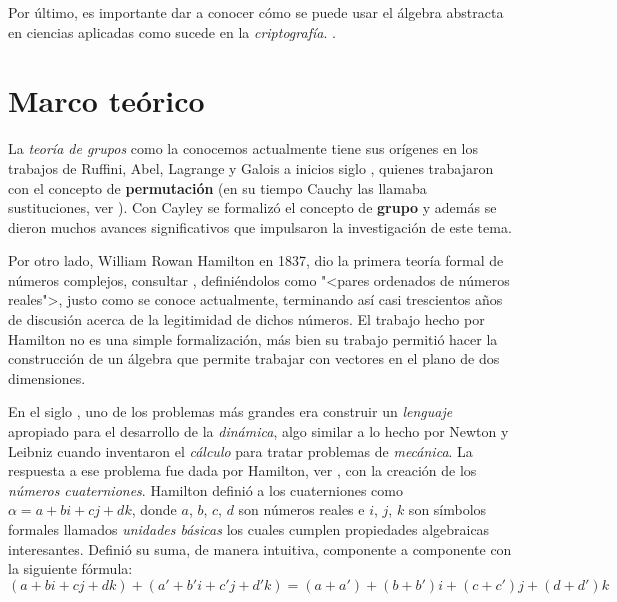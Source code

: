 \documentclass[12pt,letterpaper,titlepage]{article}
\begin{document}
Por último, es importante dar a conocer cómo se puede usar el álgebra abstracta en ciencias aplicadas como sucede en la \textit{criptografía}. \cite{b9}.

\newpage

\section{Marco teórico}

La \textit{teoría de grupos} como la conocemos actualmente tiene sus orígenes en los trabajos de Ruffini, Abel, Lagrange y Galois a inicios siglo , quienes trabajaron con el concepto de \textbf{permutación} (en su tiempo Cauchy las llamaba \textsf{sustituciones}, ver \cite[página 104]{b13}). Con Cayley \cite[página 104]{b14} se formalizó el concepto de \textbf{grupo} y además se dieron muchos avances significativos que impulsaron la investigación de este tema. \bigskip

Por otro lado, William Rowan Hamilton en 1837, dio la primera teoría formal de números complejos, consultar \cite[página 125]{b1}, definiéndolos como "<pares ordenados de números reales">, justo como se conoce actualmente, terminando así casi trescientos años de discusión acerca de la legitimidad de dichos números. El trabajo hecho por Hamilton no es una simple formalización, más bien su trabajo permitió hacer la construcción de un álgebra que permite trabajar con vectores en el plano de dos dimensiones. \bigskip

En el siglo , uno de los problemas más grandes era construir un \textit{lenguaje} apropiado para el desarrollo de la \textit{dinámica}, algo similar a lo hecho por Newton y Leibniz cuando inventaron el \textit{cálculo} para tratar problemas de \textit{mecánica}. La respuesta a ese problema fue dada por Hamilton, ver \cite[página 125]{b1}, con la creación de los \textit{números cuaterniones}. Hamilton definió a los cuaterniones como $\alpha = a+bi+cj+dk$, donde $a$, $b$, $c$, $d$ son números reales e $i$, $j$, $k$ son símbolos formales llamados \textit{unidades básicas} los cuales cumplen propiedades algebraicas interesantes. Definió su \textsf{suma}, de manera intuitiva, componente a componente con la siguiente fórmula:
\begin{equation*}
(a+bi+cj+dk)+(a'+b'i+c'j+d'k) = (a+a')+(b+b')i+(c+c')j+(d+d')k
\end{equation*}
\end{document}
